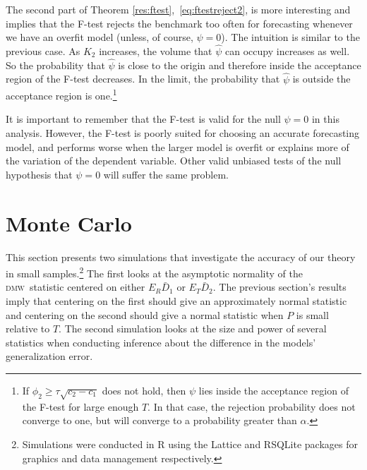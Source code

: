 \documentclass[11pt]{article}
\newcommand{\dmw}{\textsc{dmw}}
\begin{document}
The second part of Theorem \ref{res:ftest},~\eqref{eq:ftestreject2},
is more interesting and implies that the F-test rejects the benchmark
too often for forecasting whenever we have an overfit model (unless,
of course, $\psi = 0$).  The intuition is similar to the previous
case.  As $K_2$ increases, the volume that $\hat{\psi}$ can occupy
increases as well.  So the probability that $\hat{\psi}$ is close to
the origin and therefore inside the acceptance region of the F-test
decreases.  In the limit, the probability that $\hat{\psi}$ is outside
the acceptance region is one.\footnote{If $\phi_2 \geq \tau \sqrt{c_2
    - c_1}$ does not hold, then $\psi$ lies inside the acceptance
  region of the F-test for large enough $T$.  In that case, the
  rejection probability does not converge to one, but will converge to
  a probability greater than $\alpha$.}

It is important to remember that the F-test is valid for the null
$\psi = 0$ in this analysis.  However, the F-test is poorly suited for
choosing an accurate forecasting model, and performs worse when the
larger model is overfit or explains more of the variation of the
dependent variable.  Other valid unbiased tests of the null hypothesis
that $\psi = 0$ will suffer the same problem.

\section{Monte Carlo}\label{sec:mc}
\newcommand{\thetanorm}{\ensuremath{\lvert \theta \rvert_2}} This
section presents two simulations that investigate the accuracy of our
theory in small samples.\footnote{Simulations were conducted in R
  \citep{rproject} using the Lattice \citep{lattice} and RSQLite
  \citep{rsqlite} packages for graphics and data management
  respectively.}  The first looks at the asymptotic normality of the
\dmw\ statistic centered on either $E_R \bar D_1$ or $E_T \bar D_2$.
The previous section's results imply that centering on the first
should give an approximately normal statistic and centering on the
second should give a normal statistic when $P$ is small relative to
$T$.  The second simulation looks at the size and power of several
statistics when conducting inference about the difference in the
models' generalization error.
\end{document}
